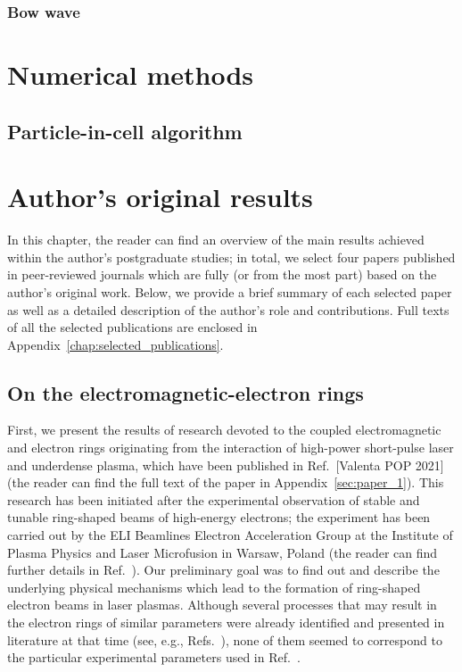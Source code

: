 \documentclass[10pt, twoside, a4paper, openright]{report}
\begin{document}
\subsection{Bow wave}
%


\chapter{Numerical methods}
%

\section{Particle-in-cell algorithm}
%


\chapter{Author's original results}
%

In this chapter, the reader can find an overview of the main results achieved within the author's postgraduate studies; in total, we select four papers published in peer-reviewed journals which are fully (or from the most part) based on the author's original work. Below, we provide a brief summary of each selected paper as well as a detailed description of the author's role and contributions. Full texts of all the selected publications are enclosed in Appendix~\ref{chap:selected_publications}.

\section{On the electromagnetic-electron rings}
%

First, we present the results of research devoted to the coupled electromagnetic and electron rings originating from the interaction of high-power short-pulse laser and underdense plasma, which have been published in Ref.~[Valenta POP 2021] (the reader can find the full text of the paper in Appendix~\ref{sec:paper_1}). This research has been initiated after the experimental observation of stable and tunable ring-shaped beams of high-energy electrons; the experiment has been carried out by the ELI Beamlines Electron Acceleration Group at the Institute of Plasma Physics and Laser Microfusion in Warsaw, Poland (the reader can find further details in Ref.~). Our preliminary goal was to find out and describe the underlying physical mechanisms which lead to the formation of ring-shaped electron beams in laser plasmas. Although several processes that may result in the electron rings of similar parameters were already identified and presented in literature at that time (see, e.g., Refs.~), none of them seemed to correspond to the particular experimental parameters used in Ref.~.
\end{document}
